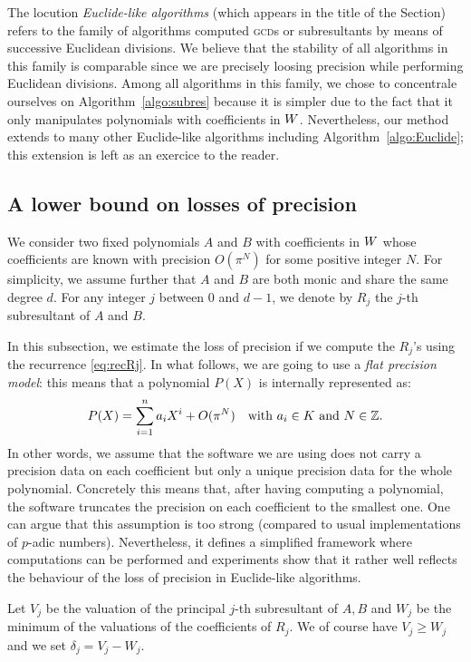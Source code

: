 \documentclass{article}
\begin{document}
\begin{rem}
The locution \emph{Euclide-like algorithms} (which appears in the 
title of the Section) refers to the family of
algorithms computed \textsc{gcd}s or subresultants by means of successive
Euclidean divisions. We believe that the stability of all algorithms in
this family is comparable since we are precisely loosing precision
while performing Euclidean divisions.
Among all algorithms in this family, we chose to concentrale ourselves
on Algorithm~\ref{algo:subres} because it is simpler due to the fact
that it only manipulates polynomials with coefficients in $W$.
Nevertheless, our method extends to many other Euclide-like algorithms
including Algorithm~\ref{algo:Euclide}; this extension is left as an exercice to
the reader.
\end{rem}

\subsection{A lower bound on losses of precision}
\label{subsec:lowerbound}

We consider two fixed polynomials $A$ and $B$ with coefficients in $W$ 
whose coefficients are known with precision $O(\pi^N)$ for some positive
integer $N$. For simplicity, we assume further that $A$ and $B$ are both
monic and share the same degree $d$. 
For any integer $j$ between $0$ and $d-1$, we denote by $R_j$ the $j$-th 
subresultant of $A$ and $B$.

In this subsection, we estimate the loss of precision if we compute the 
$R_j$'s using the recurrence \eqref{eq:recRj}.
In what follows, we are going to use a \emph{flat precision model}: this 
means that a polynomial $P(X)$ is internally represented as:
$$P(X) = \sum_{i=1}^n a_i X^i + O(\pi^N)
\quad \text{with } a_i \in K \text{ and } N \in \mathbb Z.$$
In other words, we assume that the software we are using does not
carry a precision data on each coefficient but only a unique precision
data for the whole polynomial. Concretely this means that, after having
computing a polynomial, the software truncates the precision on each
coefficient to the smallest one.
One can argue that this assumption is too strong (compared to usual
implementations of $p$-adic numbers). Nevertheless, it defines a 
simplified framework where computations can be performed and experiments 
show that it rather well reflects the behaviour of the loss of precision 
in Euclide-like algorithms.

Let $V_j$ be the valuation of the principal $j$-th subresultant of $A,B$ 
and $W_j$ be the minimum of the valuations of the coefficients of $R_j$. 
We of course have $V_j \geq W_j$ and we set $\delta_j = V_j - W_j$.
\end{document}
